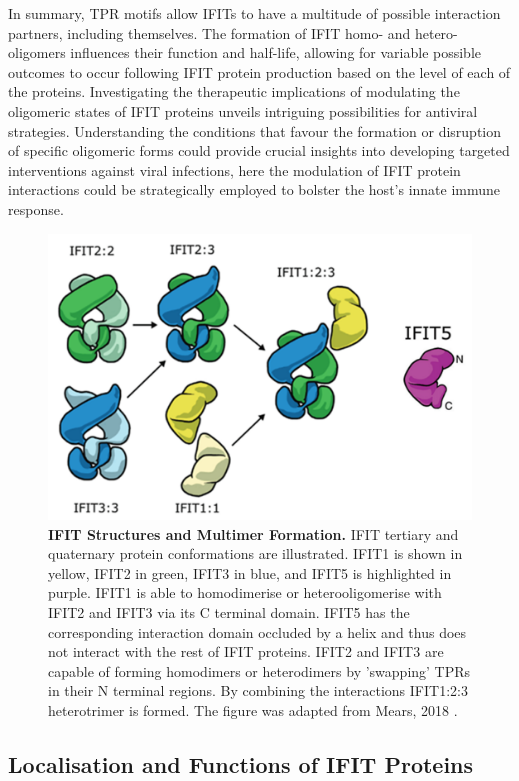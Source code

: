 In summary, TPR motifs allow IFITs to have a multitude of possible interaction partners, including themselves. The formation of IFIT homo- and hetero-oligomers influences their function and half-life, allowing for variable possible outcomes to occur following IFIT protein production based on the level of each of the proteins. Investigating the therapeutic implications of modulating the oligomeric states of IFIT proteins unveils intriguing possibilities for antiviral strategies. Understanding the conditions that favour the formation or disruption of specific oligomeric forms could provide crucial insights into developing targeted interventions against viral infections, here the modulation of IFIT protein interactions could be strategically employed to bolster the host's innate immune response.

\begin{figure}
    \centering
    \includegraphics[width=0.75\linewidth]{04. Introduction//Figs/05. IFIT-complexes.png}
    \caption[IFIT Structures and Multimer Formation.]{\textbf{IFIT Structures and Multimer Formation.} IFIT tertiary and quaternary protein conformations are illustrated. IFIT1 is shown in yellow, IFIT2 in green, IFIT3 in blue, and IFIT5 is highlighted in purple. IFIT1 is able to homodimerise or heterooligomerise with IFIT2 and IFIT3 via its C terminal domain. IFIT5 has the corresponding interaction domain occluded by a helix and thus does not interact with the rest of IFIT proteins. IFIT2 and IFIT3 are capable of forming homodimers or heterodimers by 'swapping' TPRs in their N terminal regions. By combining the interactions IFIT1:2:3 heterotrimer is formed. The figure was adapted from Mears, 2018 \cite{Mears2018BetterResponse}.}
    \label{fig:IFIT Structures and Multimer Formation.}
\end{figure}

\subsection{Localisation and Functions of IFIT Proteins} \label{subsec:Localisation and Functions of IFIT Proteins}
